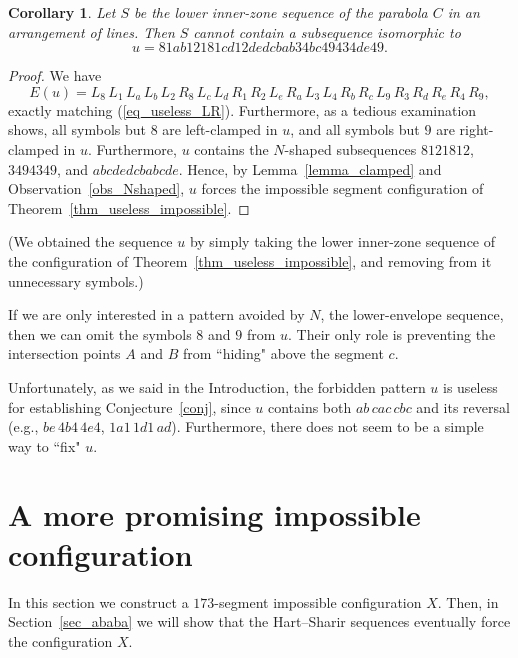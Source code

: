 \documentclass[11pt]{article}
\newtheorem{corollary}[theorem]{Corollary}
\theoremstyle{definition}
\theoremstyle{remark}
\begin{document}
\begin{corollary}\label{cor_useless_forbidden}
Let $S$ be the lower inner-zone sequence of the parabola $C$ in an arrangement of lines. Then $S$ cannot contain a subsequence isomorphic to
\begin{equation*}
u = 81ab12181cd12dedcbab34bc49434de49.
\end{equation*}
\end{corollary}

\begin{proof}
We have
\begin{equation*}
E(u) = L_8\, L_1\, L_a\, L_b\, L_2\, R_8\, L_c\, L_d\, R_1\, R_2\, L_e\, R_a\, L_3\, L_4\, R_b\, R_c\, L_9\, R_3\, R_d\, R_e\, R_4\, R_9,
\end{equation*}
exactly matching (\ref{eq_useless_LR}). Furthermore, as a tedious examination shows, all symbols but $8$ are left-clamped in $u$, and all symbols but $9$ are right-clamped in $u$. Furthermore,
 $u$ contains the $N$-shaped subsequences $8121812$, $3494349$, and $abcdedcbabcde$. Hence, by Lemma~\ref{lemma_clamped} and Observation~\ref{obs_Nshaped}, $u$ forces the impossible segment configuration of Theorem~\ref{thm_useless_impossible}.
\end{proof}

(We obtained the sequence $u$ by simply taking the lower inner-zone sequence of the configuration of Theorem~\ref{thm_useless_impossible}, and removing from it unnecessary symbols.)

If we are only interested in a pattern avoided by $N$, the lower-envelope sequence, then we can omit the symbols $8$ and $9$ from $u$. Their only role is preventing the intersection points $A$ and $B$ from ``hiding" above the segment $c$.

Unfortunately, as we said in the Introduction, the forbidden pattern $u$ is useless for establishing Conjecture~\ref{conj}, since $u$ contains both $ab\, cac\, cbc$ and its reversal (e.g., $be\,4b4\,4e4$, $1a1\,1d1\,ad$). Furthermore, there does not seem to be a simple way to ``fix" $u$.

\section{A more promising impossible configuration}\label{sec_forbidden_2}

In this section we construct a $173$-segment impossible configuration $X$. Then, in Section~\ref{sec_ababa} we will show that the Hart--Sharir sequences eventually force the configuration $X$.
\end{document}
